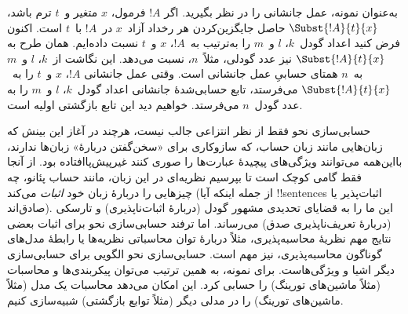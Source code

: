 \documentclass[../../../include/open-logic-section]{subfiles}
\begin{document}
به‌عنوان نمونه، عمل جانشانی را در نظر بگیرید. اگر $!A$ فرمول، $x$
متغیر و~$t$ ترم باشد، $\Subst{!A}{t}{x}$ حاصل جایگزین‌کردن هر رخداد
آزاد~$x$ در~$!A$ با~$t$ است. اکنون فرض کنید اعداد گودل~$k$، $l$ و~$m$
را به‌ترتیب به~$!A$، $x$ و~$t$ نسبت داده‌ایم. همان طرح به
$\Subst{!A}{t}{x}$ نیز عدد گودلی، مثلاً~$n$، نسبت می‌دهد. این نگاشت
از~$k$، $l$ و~$m$ به~$n$ همتای حسابیِ عمل جانشانی است. وقتی عمل
جانشانی $!A$، $x$ و~$t$ را به~$\Subst{!A}{t}{x}$ می‌فرستد، تابع
حسابی‌شدهٔ جانشانی اعداد گودل~$k$، $l$ و~$m$ را به عدد گودل~$n$
می‌فرستد. خواهیم دید این تابع بازگشتی اولیه است.

حسابی‌سازی نحو فقط از نظر انتزاعی جالب نیست، هرچند در آغاز این بینش
که زبان‌هایی مانند زبان حساب، که سازوکاری برای «سخن‌گفتن دربارهٔ»
زبان‌ها ندارند، بااین‌همه می‌توانند ویژگی‌های پیچیدهٔ عبارت‌ها را
صوری کنند غیرپیش‌پاافتاده بود. از آنجا فقط گامی کوچک است تا بپرسیم
نظریه‌ای در این زبان، مانند حساب پئانو، چه چیزهایی را دربارهٔ زبان
خود \emph{اثبات} می‌کند (از جمله اینکه آیا !!{sentence}s اثبات‌پذیر یا
صادق‌اند). این ما را به قضایای تحدیدی مشهور گودل (دربارهٔ
اثبات‌ناپذیری) و تارسکی (دربارهٔ تعریف‌ناپذیری صدق) می‌رساند. اما
ترفند حسابی‌سازی نحو برای اثبات بعضی نتایج مهم نظریهٔ محاسبه‌پذیری،
مثلاً دربارهٔ توان محاسباتی نظریه‌ها یا رابطهٔ مدل‌های گوناگون
محاسبه‌پذیری، نیز مهم است. حسابی‌سازی نحو الگویی برای حسابی‌سازی دیگر
اشیا و ویژگی‌هاست. برای نمونه، به همین ترتیب می‌توان پیکربندی‌ها و
محاسبات (مثلاً ماشین‌های تورینگ) را حسابی کرد. این امکان می‌دهد
محاسبات یک مدل (مثلاً ماشین‌های تورینگ) را در مدلی دیگر (مثلاً توابع
بازگشتی) شبیه‌سازی کنیم.
\end{document}
